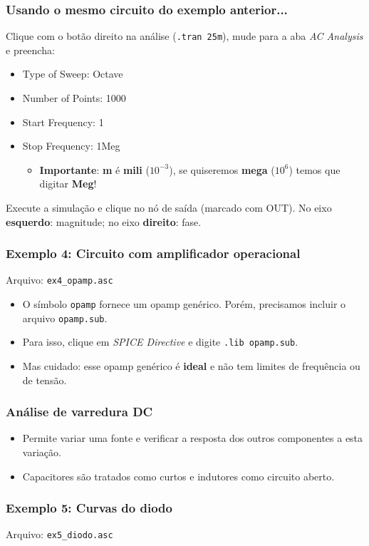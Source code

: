 \documentclass{beamer}
\begin{document}
\begin{frame}
\frametitle{Usando o mesmo circuito do exemplo anterior...}
Clique com o botão direito na análise (\texttt{.tran 25m}), mude para a aba \textit{AC Analysis} e preencha:
\begin{itemize}

\item{Type of Sweep}: Octave
\item{Number of Points}: 1000
\item{Start Frequency}: 1
\item{Stop Frequency}: 1Meg
\begin{itemize}
\item{\textbf{Importante}}: \textbf{m} é \textbf{mili} ($10^{-3}$), se quiseremos \textbf{mega} ($10^6$) temos que digitar \textbf{Meg}!
\end{itemize}
\end{itemize}
Execute a simulação e clique no nó de saída (marcado com OUT). No eixo \textbf{esquerdo}: magnitude; no eixo \textbf{direito}: fase.
\end{frame}

\begin{frame}
\frametitle{Exemplo 4: Circuito com amplificador operacional}
Arquivo: \texttt{ex4\_opamp.asc}
\begin{itemize}
\item{O símbolo \texttt{opamp} fornece um opamp genérico. Porém, precisamos incluir o arquivo \texttt{opamp.sub}.}
\item{Para isso, clique em \textit{SPICE Directive} e digite \texttt{.lib opamp.sub}}.
\item{Mas cuidado: esse opamp genérico é \textbf{ideal} e não tem limites de frequência ou de tensão.}
\end{itemize}
\end{frame}

\begin{frame}
\frametitle{Análise de varredura DC}
\begin{itemize}
\item{Permite variar uma fonte e verificar a resposta dos outros componentes a esta variação.}
\item{Capacitores são tratados como curtos e indutores como circuito aberto.}
\end{itemize}
\end{frame}

\begin{frame}
\frametitle{Exemplo 5: Curvas do diodo}
Arquivo: \texttt{ex5\_diodo.asc}
\end{frame}
\end{document}
